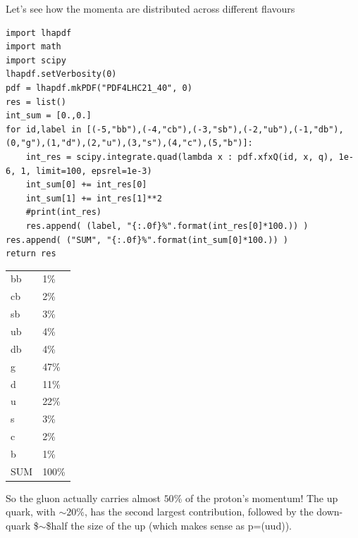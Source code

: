 \documentclass[11pt]{article}
\begin{document}
Let's see how the momenta are distributed across different flavours
\begin{verbatim}
import lhapdf
import math
import scipy
lhapdf.setVerbosity(0)
pdf = lhapdf.mkPDF("PDF4LHC21_40", 0)
res = list()
int_sum = [0.,0.]
for id,label in [(-5,"bb"),(-4,"cb"),(-3,"sb"),(-2,"ub"),(-1,"db"),(0,"g"),(1,"d"),(2,"u"),(3,"s"),(4,"c"),(5,"b")]:
    int_res = scipy.integrate.quad(lambda x : pdf.xfxQ(id, x, q), 1e-6, 1, limit=100, epsrel=1e-3)
    int_sum[0] += int_res[0]
    int_sum[1] += int_res[1]**2
    #print(int_res)
    res.append( (label, "{:.0f}%".format(int_res[0]*100.)) )
res.append( ("SUM", "{:.0f}%".format(int_sum[0]*100.)) )
return res
\end{verbatim}

\begin{center}
\begin{tabular}{ll}
bb & 1\%\\[0pt]
cb & 2\%\\[0pt]
sb & 3\%\\[0pt]
ub & 4\%\\[0pt]
db & 4\%\\[0pt]
g & 47\%\\[0pt]
d & 11\%\\[0pt]
u & 22\%\\[0pt]
s & 3\%\\[0pt]
c & 2\%\\[0pt]
b & 1\%\\[0pt]
SUM & 100\%\\[0pt]
\end{tabular}
\end{center}

So the gluon actually carries almost \(50\%\) of the proton's momentum!
The up quark, with \(\sim20\%\), has the second largest contribution, followed by the down-quark \$\(\sim\)\$half the size of the up (which makes sense as p=(uud)).
\end{document}
